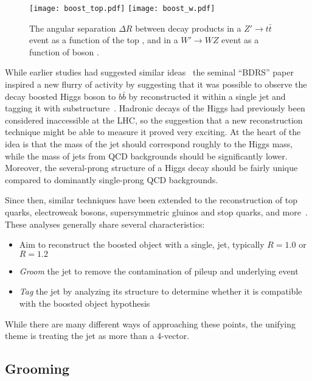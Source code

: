 
\begin{figure}
\centering
\texttt{[image: boost\_top.pdf]}
\texttt{[image: boost\_w.pdf]}
\caption{The angular separation $\Delta R$ between decay products in a $Z'\rightarrow t\bar{t}$ event as a function of the top \pt, and in a $W'\rightarrow WZ$ event as a function of boson \pt.}
\label{fig:jets:boost}
\end{figure}




While earlier studies had suggested similar ideas~\cite{Seymour:1993mx,Butterworth:2002tt} the seminal ``BDRS'' paper inspired a new flurry of activity by suggesting that it was possible to observe the decay boosted Higgs boson to $b\bar{b}$ by reconstructed  it within a single jet and tagging it with substructure~\cite{BDRS}. Hadronic decays of the Higgs had previously been considered inaccessible at the LHC, so the suggestion that a new reconstruction technique might be able to measure it proved very exciting. At the heart of the idea is that the mass of the jet should correspond roughly to the Higgs mass, while the mass of jets from QCD backgrounds should be significantly lower. Moreover, the several-prong structure of a Higgs decay should be fairly unique compared to dominantly single-prong QCD backgrounds.

Since then, similar techniques have been extended to the reconstruction of top quarks, electroweak bosons, supersymmetric gluinos and stop quarks, and more~\cite{Anders:2013oga,Plehn:2009rk,Rehermann:2010vq,Bai:2013xla,Larkoski:2014wba,EEC,ATLAS:2012dp}. These analyses generally share several characteristics:
%
\begin{itemize}
\item Aim to reconstruct the boosted object with a single, \largeR jet, typically $R=1.0$ or $R=1.2$
\item \textit{Groom} the jet to remove the contamination of pileup and underlying event 
\item \textit{Tag} the jet by analyzing its structure to determine whether it is compatible with the boosted object hypothesis
\end{itemize}
%
While there are many different ways of approaching these points, the unifying theme is treating the jet as more than a 4-vector. 

\subsection{Grooming}
\label{chapter:jets-and-substructure:grooming}

